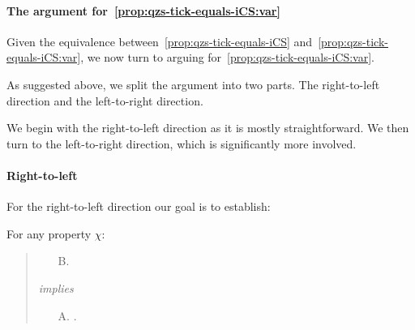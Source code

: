 


\paragraph*{The argument for~\autoref{prop:qzs-tick-equals-iCS:var}}

\begin{note}
  Given the equivalence between~\autoref{prop:qzs-tick-equals-iCS} and~\autoref{prop:qzs-tick-equals-iCS:var}, we now turn to arguing for~\autoref{prop:qzs-tick-equals-iCS:var}.

  As suggested above, we split the argument into two parts.
  The right-to-left direction and the left-to-right direction.

  We begin with the right-to-left direction as it is mostly straightforward.
  We then turn to the left-to-right direction, which is significantly more involved.
\end{note}

\paragraph*{Right-to-left}

\begin{note}
  For the right-to-left direction our goal is to establish:

  For any property \(\chi\):
  \begin{quote}
  \begin{enumerate}
    \item[B.]
    \end{enumerate}
    \emph{implies}
    \begin{enumerate}
    \item[A.]
      .
    \end{enumerate}
  \end{quote}
\end{note}

